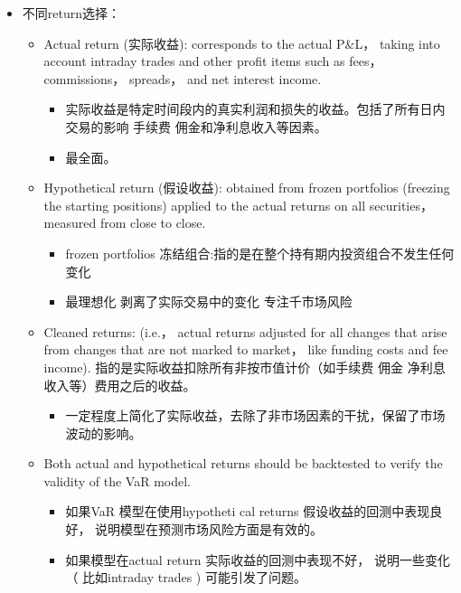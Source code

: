 \begin{itemize}
\begin{itemize}
\begin{itemize}
\begin{itemize}
                \end{itemize}
            \item The actual return corresponds to the actual P\&L， taking into account intraday trades (日内交易) and other profit items such as fees， commissions， spreads， and net interest income.
            \end{itemize}
        \item 不同return选择：
            \begin{itemize}
            \item Actual return (实际收益): corresponds to the actual P\&L， taking into account intraday trades and other profit items such as fees， commissions， spreads， and net interest income.
                \begin{itemize}
                \item 实际收益是特定时间段内的真实利润和损失的收益。包括了所有日内
                交易的影响 手续费 佣金和净利息收入等因素。
                \item 最全面。
                \end{itemize}
            \item Hypothetical return (假设收益): obtained from frozen portfolios (freezing the starting positions) applied to the actual returns on all securities， measured from close to close.
                \begin{itemize}
                \item frozen portfolios 冻结组合:指的是在整个持有期内投资组合不发生任何变化
                \item  最理想化 剥离了实际交易中的变化 专注千市场风险
                \end{itemize}
            \item Cleaned returns: (i.e.， actual returns adjusted for all changes that arise from changes that are not marked to market， like funding costs and fee income). 指的是实际收益扣除所有非按市值计价（如手续费
            佣金 净利息收入等）费用之后的收益。
                \begin{itemize}
                \item  一定程度上简化了实际收益，去除了非市场因素的干扰，保留了市场波动的影响。
                \end{itemize}
            \item Both actual and hypothetical returns should be backtested to verify the validity of the VaR model.
                 \begin{itemize}
                \item 如果VaR 模型在使用hypotheti cal returns 假设收益的回测中表现良好， 说明模型在预测市场风险方面是有效的。
                \item 如果模型在actual return 实际收益的回测中表现不好， 说明一些变化（ 比如intraday trades ) 可能引发了问题。
                \end{itemize}
            \end{itemize}
         \end{itemize}
     \end{itemize}

